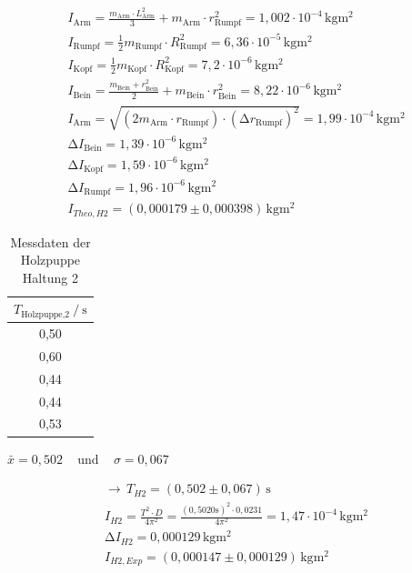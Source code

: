 \begin{align*}
     I_{\text{Arm}} = \frac{m_{\text{Arm}} \cdot L^2_{\text{Arm}}}{3} + m_{\text{Arm}} \cdot r^2_{\text{Rumpf}} = 1,002 \cdot 10^{-4}\,\unit{\kilogram\meter^2} \\
     I_{\text{Rumpf}} = \frac{1}{2}m_{\text{Rumpf}} \cdot R^2_{\text{Rumpf}} = 6,36 \cdot 10^{-5}\,\unit{\kilogram\meter^2} \\
     I_{\text{Kopf}} = \frac{1}{2}m_{\text{Kopf}} \cdot R^2_{\text{Kopf}} = 7,2 \cdot 10^{-6}\,\unit{\kilogram\meter^2} \\
     I_{\text{Bein}} = \frac{m_{\text{Bein}} + r^2_{\text{Bein}}}{2} + m_{\text{Bein}} \cdot r^2_{\text{Bein}} = 8,22 \cdot 10^{-6}\,\unit{\kilogram\meter^2} \\
     I_{\text{Arm}} = \sqrt{ (2m_{\text{Arm}} \cdot r_{\text{Rumpf}}) \cdot (\increment r_{\text{Rumpf}})^2} = 1,99 \cdot 10^{-4}\,\unit{\kilogram\meter^2}  \\
     \increment I_{\text{Bein}} = 1,39 \cdot 10^{-6}\,\unit{\kilogram\meter^2}  \\
     \increment I_{\text{Kopf}} = 1,59 \cdot 10^{-6}\,\unit{\kilogram\meter^2}  \\
     \increment I_{\text{Rumpf}} = 1,96 \cdot 10^{-6}\,\unit{\kilogram\meter^2}   \\
     I_{Theo,H2} = (0,000179 \pm 0,000398)\, \unit{\kilogram\meter^2} 
\end{align*}


\begin{table} 
    \centering
    \caption{Messdaten der Holzpuppe Haltung 2}
    \label{Tabelle7}
    \begin{tabular} {c}
        \toprule
        {$ T_{\text{Holzpuppe,2}} \mathbin{/} \unit{\second} $} \\
        \midrule
        0,50 \\
        0,60 \\
        0,44 \\
        0,44 \\
        0,53 \\
        \bottomrule
    \end{tabular} 
\end{table}

\begin{center}
    $\bar{x} = 0,502$ \,\,\,  und \,\,\, $\sigma = 0,067 $
\end{center}

\begin{align*}
    \to  \,  T_{H2} = (0,502 \pm 0,067)\, \unit{\second}\\
    I_{H2} = \frac{T^2 \cdot D}{4\pi^2} = \frac{(0,5020 \unit{\second})^2 \cdot 0,0231}{4 \pi^2} = 1,47 \cdot 10^{-4}\,\unit{\kilogram\meter^2} \\ 
    \increment I_{H2} = 0,000129\,\unit{\kilogram\meter^2} \\
    I_{H2,Exp} = (0,000147 \pm 0,000129)\,\unit{\kilogram\meter^2} 
\end{align*}
